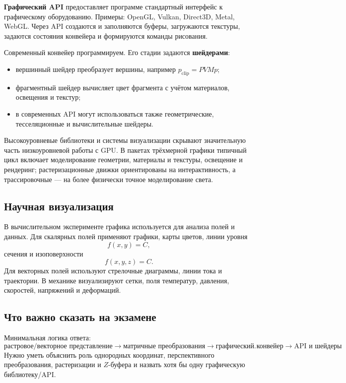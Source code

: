 \textbf{Графический API} предоставляет программе стандартный интерфейс к графическому оборудованию. Примеры: OpenGL, Vulkan, Direct3D, Metal, WebGL. Через API создаются и заполняются буферы, загружаются текстуры, задаются состояния конвейера и формируются команды рисования.

Современный конвейер программируем. Его стадии задаются \textbf{шейдерами}:
\begin{itemize}
\item вершинный шейдер преобразует вершины, например $p_{\mathrm{clip}}=PVMp$;
\item фрагментный шейдер вычисляет цвет фрагмента с учётом материалов, освещения и текстур;
\item в современных API могут использоваться также геометрические, тесселяционные и вычислительные шейдеры.
\end{itemize}

Высокоуровневые библиотеки и системы визуализации скрывают значительную часть низкоуровневой работы с GPU. В пакетах трёхмерной графики типичный цикл включает моделирование геометрии, материалы и текстуры, освещение и рендеринг; растеризационные движки ориентированы на интерактивность, а трассировочные --- на более физически точное моделирование света.

\subsection{Научная визуализация}

В вычислительном эксперименте графика используется для анализа полей и данных. Для скалярных полей применяют графики, карты цветов, линии уровня
\[
f(x,y)=C,
\]
сечения и изоповерхности
\[
f(x,y,z)=C.
\]
Для векторных полей используют стрелочные диаграммы, линии тока и траектории. В механике визуализируют сетки, поля температур, давления, скоростей, напряжений и деформаций.

\subsection{Что важно сказать на экзамене}

Минимальная логика ответа:
\[
\boxed{
\text{растровое/векторное представление}
\rightarrow
\text{матричные преобразования}
\rightarrow
\text{графический конвейер}
\rightarrow
\text{API и шейдеры}
}.
\]
Нужно уметь объяснить роль однородных координат, перспективного преобразования, растеризации и $Z$-буфера и назвать хотя бы одну графическую библиотеку/API.

\newpage
